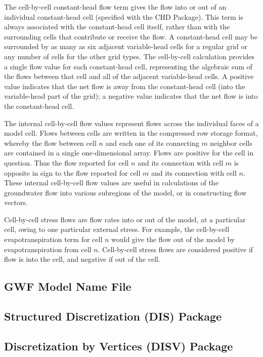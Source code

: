 The cell-by-cell constant-head flow term gives the flow into or out of an individual constant-head cell (specified with the CHD Package).  This term is always associated with the constant-head cell itself, rather than with the surrounding cells that contribute or receive the flow.  A constant-head cell may be surrounded by as many as six adjacent variable-head cells for a regular grid or any number of cells for the other grid types.  The cell-by-cell calculation provides a single flow value for each constant-head cell, representing the algebraic sum of the flows between that cell and all of the adjacent variable-head cells.  A positive value indicates that the net flow is away from the constant-head cell (into the variable-head part of the grid); a negative value indicates that the net flow is into the constant-head cell.

The internal cell-by-cell flow values represent flows across the individual faces of a model cell.  Flows between cells are written in the compressed row storage format, whereby the flow between cell $n$ and each one of its connecting $m$ neighbor cells are contained in a single one-dimensional array.  Flows are positive for the cell in question.  Thus the flow reported for cell $n$ and its connection with cell $m$ is opposite in sign to the flow reported for cell $m$ and its connection with cell $n$.  These internal cell-by-cell flow values are useful in calculations of the groundwater flow into various subregions of the model, or in constructing flow vectors.

Cell-by-cell stress flows are flow rates into or out of the model, at a particular cell, owing to one particular external stress.  For example, the cell-by-cell evapotranspiration term for cell $n$ would give the flow out of the model by evapotranspiration from cell $n$.  Cell-by-cell stress flows are considered positive if flow is into the cell, and negative if out of the cell.

\newpage
\subsection{GWF Model Name File}


\newpage
\subsection{Structured Discretization (DIS) Package}


\newpage
\subsection{Discretization by Vertices (DISV) Package}


